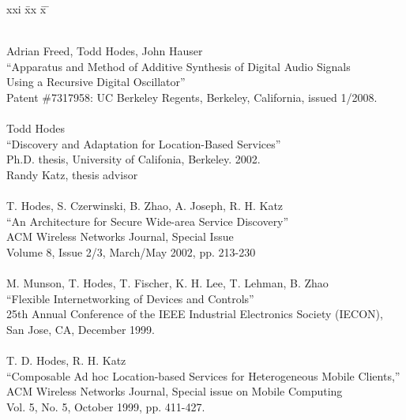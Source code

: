 \begin{tabbing}
xxi \= xx \= x \= \kill

\smallskip \\[-3pt]
\>    Adrian Freed, Todd Hodes, John Hauser \\
\>\>      ``Apparatus and Method of Additive Synthesis of Digital Audio Signals \\
\>\>   Using a Recursive Digital Oscillator'' \\
\>\>    Patent \#7317958: UC Berkeley Regents, Berkeley, California, issued 1/2008. \\

\smallskip \\[-3pt]
\>    Todd Hodes \\
\>\>      ``Discovery and Adaptation for Location-Based Services'' \\
\>\>    Ph.D. thesis, University of Califonia, Berkeley. 2002. \\
\>\>    Randy Katz, thesis advisor \\

\smallskip \\[-3pt]
\>    T. Hodes, S. Czerwinski, B. Zhao, A. Joseph, R. H. Katz \\
\>\>      ``An Architecture for Secure Wide-area Service Discovery'' \\
\>\>       ACM Wireless Networks Journal, Special Issue \\
\>\>       Volume 8, Issue 2/3, March/May 2002, pp. 213-230 \\

\smallskip \\[-3pt]
\>   M. Munson, T. Hodes, T. Fischer, K. H. Lee, T. Lehman, B. Zhao \\
\>\>      ``Flexible Internetworking of Devices and Controls'' \\
\>\>        25th Annual Conference of the IEEE Industrial Electronics Society (IECON),  \\
\>\>	    San Jose, CA, December 1999. \\

\smallskip \\[-3pt]
\>    T. D. Hodes, R. H. Katz \\
\>\>      ``Composable Ad hoc Location-based Services for Heterogeneous
             Mobile Clients,'' \\
\>\>       ACM Wireless Networks Journal, Special issue on Mobile Computing \\
\>\>       Vol. 5, No. 5, October 1999, pp. 411-427. \\



\end{tabbing}
